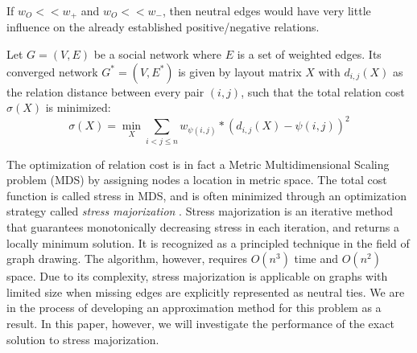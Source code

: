 If $w_{O} << w_{+}$ and $w_{O} << w_{-}$, then neutral edges would
have very little influence on the already established
positive/negative relations.

\begin{definition}
Let $G=(V,E)$ be a social network where $E$ is a set of weighted
edges. Its converged network $G^{*}=(V,E^{*})$ is given by layout
matrix $X$ with $d_{i,j}(X)$ as the relation distance between every
pair $(i,j)$, such that the total relation cost $\sigma(X)$ is
minimized:
\[\sigma(X)= \min_{X} \sum_{i<j \leq n}w_{\psi(i,j)}*(d_{i,j}(X)-\psi{(i,j)})^2\]
\end{definition}

The optimization of relation cost is in fact a Metric Multidimensional
Scaling problem (MDS) by assigning nodes a location in metric
space. The total cost function is called stress in MDS, and is often
minimized through an optimization strategy called {\it stress
  majorization} \cite {Gansner:05}. Stress majorization is an
iterative method that guarantees monotonically decreasing stress in
each iteration, and returns a locally minimum solution.  It is
recognized as a principled technique in the field of graph
drawing. The algorithm, however, requires $O(n^3)$ time and $O(n^{2})$
space. Due to its complexity, stress majorization is applicable on
graphs with limited size when missing edges are explicitly represented
as neutral ties. We are in the process of developing an approximation
method for this problem as a result. In this paper, however, we will
investigate the performance of the exact solution to stress
majorization.



